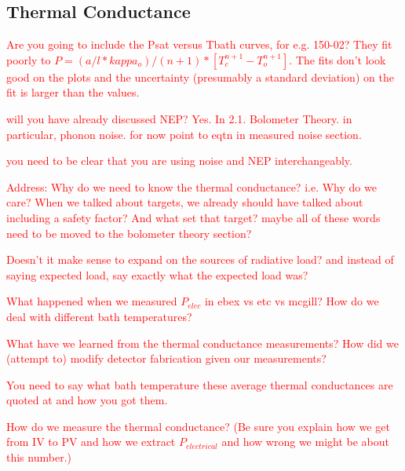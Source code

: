 \subsection{Thermal Conductance}
\label{sec:thermal_conductance}

\textcolor{red}{Are you going to include the Psat versus Tbath curves, for e.g. 150-02? They fit poorly to  $P = (a/l*kappa_{o})/(n+1)*[T_{c}^{n+1} - T_{o}^{n+1}]$. The fits don't look good on the plots and the uncertainty (presumably a standard deviation) on the fit is larger than the values.}



\textcolor{red}{will you have already discussed \ac{NEP}? Yes. In 2.1. Bolometer Theory. in particular, phonon noise. for now point to eqtn in measured noise section.}

\textcolor{red}{you need to be clear that you are using noise and \ac{NEP} interchangeably.}

\textcolor{red}{Address: Why do we need to know the thermal conductance? i.e. Why do we care? When we talked about targets, we already should have talked about including a safety factor? And what set that target? maybe all of these words need to be moved to the bolometer theory section?}

\textcolor{red}{Doesn't it make sense to expand on the sources of radiative load? and instead of saying expected load, say exactly what the expected load was?}

\textcolor{red}{ What happened when we measured $P_{elec}$ in ebex vs etc vs mcgill? How do we deal with different bath temperatures?}

\textcolor{red}{What have we learned from the thermal conductance measurements? How did we (attempt to) modify detector fabrication given our measurements?}

\textcolor{red}{You need to say what bath temperature these average thermal conductances are quoted at and how you got them.}

\textcolor{red}{How do we measure the thermal conductance? (Be sure you explain how we get from IV to PV and how we extract $P_{electrical}$ and how wrong we might be about this number.)}

